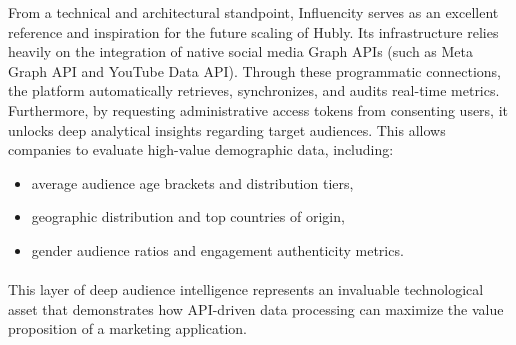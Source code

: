 From a technical and architectural standpoint, Influencity serves as an excellent reference and inspiration for the future scaling of Hubly. Its infrastructure relies heavily on the integration of native social media Graph APIs (such as Meta Graph API and YouTube Data API). Through these programmatic connections, the platform automatically retrieves, synchronizes, and audits real-time metrics. Furthermore, by requesting administrative access tokens from consenting users, it unlocks deep analytical insights regarding target audiences. This allows companies to evaluate high-value demographic data, including:
\begin{itemize}
    \item average audience age brackets and distribution tiers,
    \item geographic distribution and top countries of origin,
    \item gender audience ratios and engagement authenticity metrics.
\end{itemize}
\paragraph{}This layer of deep audience intelligence represents an invaluable technological asset that demonstrates how API-driven data processing can maximize the value proposition of a marketing application.

